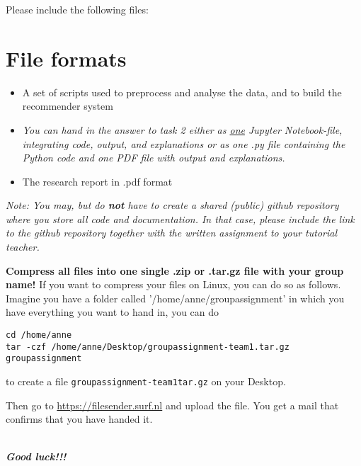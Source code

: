 Please include the following files:   
\section*{File formats}

\begin{itemize}
	\item  A set of scripts used to preprocess and analyse the data, and to build the recommender system
	\item \emph{
		You can hand in the answer to task 2 \emph{either} as \underline{one} Jupyter Notebook-file, integrating code, output, and explanations \emph{or} as one .py file containing the Python code and one PDF file with output and explanations.
	}
	\item The research report in .pdf format
\end{itemize}

\emph{Note: You may, but do \textbf{not} have to create a shared (public) github repository where you store all code and documentation. In that case, please include the link to the github repository together with the written assignment to your tutorial teacher.}

\textbf{Compress all files into one single .zip or .tar.gz file with your group name!}
If you want to compress your files on Linux, you can do so as follows. Imagine you have a folder called '/home/anne/groupassignment' in which you have everything you want to hand in, you can do

\begin{lstlisting}
cd /home/anne
tar -czf /home/anne/Desktop/groupassignment-team1.tar.gz groupassignment
\end{lstlisting}
to create a file \texttt{groupassignment-team1tar.gz} on your Desktop.

Then go to \url{https://filesender.surf.nl} and upload the file.
You get a mail that confirms that you have handed it. 

~\\
\textbf{\emph{Good luck!!!}}
